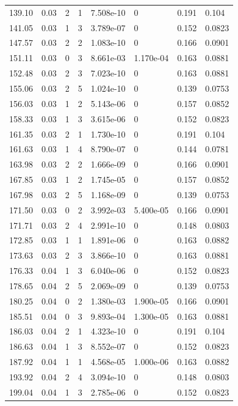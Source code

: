 \documentclass[preview]{standalone}
\begin{document}
{{{\begin{tabular}{L{1.2cm}C{1.2cm} C{0.3cm}C{0.5cm} C{1.4cm}C{1.4cm} C{1.4cm}C{1.4cm}}
  139.10  &  0.03  & 2     &  1 &  7.508e-10  & 0  & 0.191 &  0.104   \\ 
  141.05  &  0.03  & 1     &  3 &  3.789e-07  & 0  & 0.152 &  0.0823   \\ 
  147.57  &  0.03  & 2     &  2 &  1.083e-10  & 0  & 0.166 &  0.0901   \\ 
  151.11  &  0.03  & 0     &  3 &  8.661e-03  & 1.170e-04  & 0.163 &  0.0881   \\ 
  152.48  &  0.03  & 2     &  3 &  7.023e-10  & 0  & 0.163 &  0.0881   \\ 
  155.06  &  0.03  & 2     &  5 &  1.024e-10  & 0  & 0.139 &  0.0753   \\ 
  156.03  &  0.03  & 1     &  2 &  5.143e-06  & 0  & 0.157 &  0.0852   \\ 
  158.33  &  0.03  & 1     &  3 &  3.615e-06  & 0  & 0.152 &  0.0823   \\ 
  161.35  &  0.03  & 2     &  1 &  1.730e-10  & 0  & 0.191 &  0.104   \\ 
  161.63  &  0.03  & 1     &  4 &  8.790e-07  & 0  & 0.144 &  0.0781   \\ 
  163.98  &  0.03  & 2     &  2 &  1.666e-09  & 0  & 0.166 &  0.0901   \\ 
  167.85  &  0.03  & 1     &  2 &  1.745e-05  & 0  & 0.157 &  0.0852   \\ 
  167.98  &  0.03  & 2     &  5 &  1.168e-09  & 0  & 0.139 &  0.0753   \\ 
  171.50  &  0.03  & 0     &  2 &  3.992e-03  & 5.400e-05  & 0.166 &  0.0901   \\ 
  171.71  &  0.03  & 2     &  4 &  2.991e-10  & 0  & 0.148 &  0.0803   \\ 
  172.85  &  0.03  & 1     &  1 &  1.891e-06  & 0  & 0.163 &  0.0882   \\ 
  173.63  &  0.03  & 2     &  3 &  3.866e-10  & 0  & 0.163 &  0.0881   \\ 
  176.33  &  0.04  & 1     &  3 &  6.040e-06  & 0  & 0.152 &  0.0823   \\ 
  178.65  &  0.04  & 2     &  5 &  2.069e-09  & 0  & 0.139 &  0.0753   \\ 
  180.25  &  0.04  & 0     &  2 &  1.380e-03  & 1.900e-05  & 0.166 &  0.0901   \\ 
  185.51  &  0.04  & 0     &  3 &  9.893e-04  & 1.300e-05  & 0.163 &  0.0881   \\ 
  186.03  &  0.04  & 2     &  1 &  4.323e-10  & 0  & 0.191 &  0.104   \\ 
  186.63  &  0.04  & 1     &  3 &  8.552e-07  & 0  & 0.152 &  0.0823   \\ 
  187.92  &  0.04  & 1     &  1 &  4.568e-05  & 1.000e-06  & 0.163 &  0.0882   \\ 
  193.92  &  0.04  & 2     &  4 &  3.094e-10  & 0  & 0.148 &  0.0803   \\ 
  199.04  &  0.04  & 1     &  3 &  2.785e-06  & 0  & 0.152 &  0.0823   \\ 
\hline 
\end{tabular} 

}}}
\end{document}
